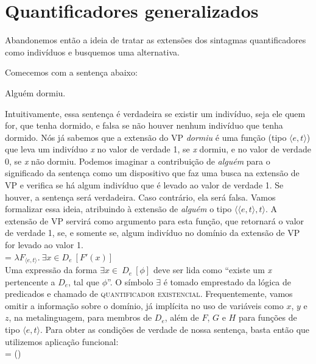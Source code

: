 \section{Quantificadores generalizados}

Abandonemos então a ideia de tratar as extensões dos sintagmas
quantificadores como indivíduos e busquemos uma alternativa.

Comecemos com a sentença abaixo:

\begin{exe}
    \ex Alguém dormiu. \label{all}
\end{exe}

Intuitivamente, essa sentença é verdadeira se existir um
indivíduo, seja ele quem for, que tenha dormido, e falsa se não
houver nenhum indivíduo que tenha dormido. Nós já sabemos que a extensão do VP
\textit{dormiu} é uma função (tipo $\langle e,t\rangle$) que leva um
indivíduo \textit{x} no valor de verdade 1, se \textit{x} dormiu, e
no valor de verdade 0, se \textit{x} não dormiu. Podemos imaginar
a contribuição de \textit{alguém} para o significado da sentença como um
dispositivo que faz uma busca na extensão de VP e verifica se há
algum indivíduo que é levado ao valor de verdade 1. Se houver, a
sentença será verdadeira. Caso contrário, ela será falsa. Vamos
formalizar essa ideia, atribuindo à extensão de \textit{alguém} o tipo
$\langle\langle e,t\rangle,t\rangle$. A extensão de VP servirá
como argumento para esta função, que retornará o valor de verdade
1, se, e somente se, algum indivíduo no domínio da extensão de VP
for levado ao valor 1.\\

\n {} = $\lambda F_{\langle e,t\rangle}.\ \exists
\textit{x} \in D_{e}\ [F'(x)]$\\

\n Uma expressão da forma \underline{$\exists \textit{x} \in\ D_{e}\ [\phi]$} deve ser lida como ``existe um \textit{x} pertencente a $D_{e}$, tal que $\phi$''. O símbolo $\exists$ é tomado emprestado da lógica de predicados e chamado de \textsc{quantificador existencial}. Frequentemente, vamos omitir a informação sobre o domínio, já implícita no uso de variáveis como $x$, $y$ e $z$, na metalinguagem, para membros de $D_{e}$, além de $F$, $G$ e $H$ para funções de tipo $\langle e,t\rangle$. Para obter as condições de verdade de nossa sentença, basta
então que utilizemos aplicação funcional:\\

\n {} =
()\\


